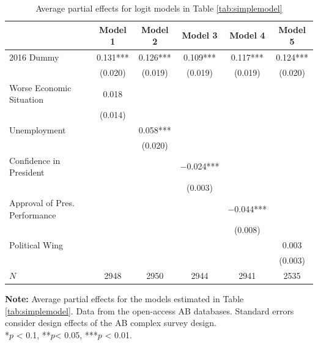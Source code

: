 \documentclass[12pt,a4]{article}
\begin{document}
\begin{table}[htbp]
\caption{Average partial effects for logit models in Table \ref{tab:simplemodel}}
\label{tab:apesimp}

\begin{tabular}[t]{lccccc}
\toprule
  & Model 1 & Model 2 & Model 3 & Model 4 & Model 5\\
\midrule
2016 Dummy & \num{0.131}*** & \num{0.126}*** & \num{0.109}*** & \num{0.117}*** & \num{0.124}***\\
 & (\num{0.020}) & (\num{0.019}) & (\num{0.019}) & (\num{0.019}) & (\num{0.020})\\
Worse Economic Situation & \num{0.018} &  &  &  & \\
 & (\num{0.014}) &  &  &  & \\
Unemployment &  & \num{0.058}*** &  &  & \\
 &  & (\num{0.020}) &  &  & \\
Confidence in President &  &  & \num{-0.024}*** &  & \\
 &  &  & (\num{0.003}) &  & \\
Approval of Pres. Performance &  &  &  & \num{-0.044}*** & \\
 &  &  &  & (\num{0.008}) & \\
Political Wing &  &  &  &  & \num{0.003}\\
 &  &  &  &  & (\num{0.003})\\
\midrule
$N$ & \num{2948} & \num{2950} & \num{2944} & \num{2941} & \num{2535}\\
\bottomrule
\end{tabular}


\vspace{0.25cm}
\textbf{Note:} Average partial effects for the models estimated in Table \ref{tab:simplemodel}. Data from the open-access AB databases. Standard errors consider design effects of the AB complex survey design.\\
*$p$ < 0.1, **$p$< 0.05, ***$p$ < 0.01.
\end{table}





\end{document}
